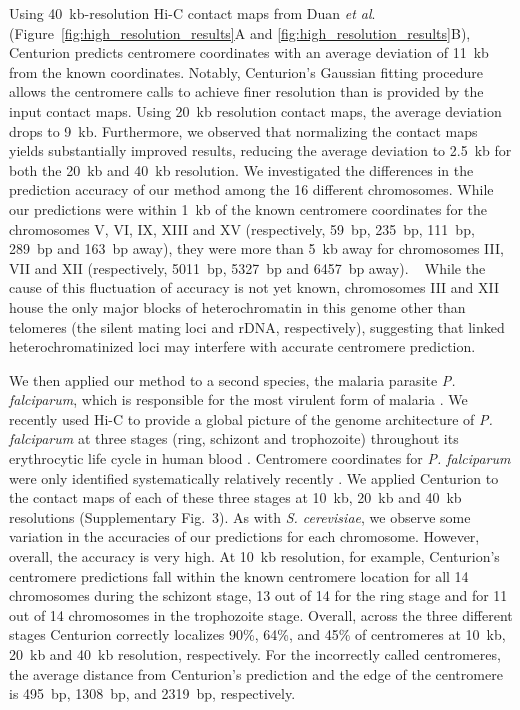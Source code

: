 Using 40~kb-resolution Hi-C contact maps from Duan
\textit{et al}.~\cite{duan:genome-wide}
(Figure~\ref{fig:high_resolution_results}A and
\ref{fig:high_resolution_results}B), Centurion predicts centromere
coordinates with an average deviation of 11~kb from the known coordinates.
Notably, Centurion's Gaussian fitting procedure allows the centromere calls to
achieve finer resolution than is provided by the input contact maps. Using
20~kb resolution contact maps, the average deviation drops to 9~kb.
Furthermore, we observed that normalizing the contact maps
\citep{imakaev:iterative} yields substantially improved results, reducing the
average deviation to 2.5~kb for both the 20~kb and 40~kb resolution. We
investigated the differences in the prediction accuracy of our method among
the 16 different chromosomes. While our predictions were within 1~kb of the
known centromere coordinates for the chromosomes V, VI, IX, XIII and XV
(respectively, 59~bp, 235~bp, 111~bp, 289~bp and 163~bp away), they were more
than 5~kb away for chromosomes III, VII and XII (respectively, 5011~bp, 5327~bp
and 6457~bp away).  
While the cause of this fluctuation of accuracy is not yet known,
chromosomes III and XII house the only major blocks of heterochromatin
in this genome other than telomeres
 (the silent mating loci and rDNA,
respectively), suggesting that linked heterochromatinized loci may interfere
with accurate centromere prediction.

We then applied our method to a second species, the malaria parasite
\textit{P. falciparum}, which is responsible for the most virulent 
form of malaria \citep{who:malaria}. We recently used Hi-C to provide a global
picture of the genome architecture of \textit{P. falciparum} at three stages
(ring, schizont and trophozoite) throughout its erythrocytic life cycle in
human blood \citep{ay:three-dimensional}. Centromere coordinates for
\textit{P. falciparum} were only identified systematically relatively recently
\citep{hoeijmakers:plasmodium}. We applied Centurion to the contact maps of
each of these three stages at 10~kb, 20~kb and 40~kb resolutions
(Supplementary Fig.~3).
As with \textit{S. cerevisiae}, we observe some
variation in the accuracies of our predictions for each chromosome. However,
overall, the accuracy is very high. At 10~kb resolution, for example,
Centurion's centromere predictions fall within the known centromere location
for all 14 chromosomes during the schizont stage, 13 out of 14 for the ring stage and for
11 out of 14 chromosomes in the trophozoite stage. Overall, across the three
different stages Centurion correctly localizes 90\%, 64\%, and 45\% of
centromeres at 10~kb, 20~kb and 40~kb resolution, respectively. For the
incorrectly called centromeres, the average distance from Centurion's
prediction and the edge of the centromere is 495~bp, 1308~bp, and 2319~bp,
respectively.

